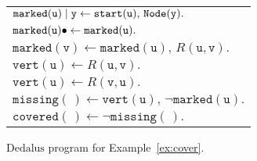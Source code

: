 \documentclass{tlp}
\newenvironment{cenchop}{\renewcommand{\arraystretch}{1.3}\begin{center}\begin{tabular}{l}}{\end{tabular}\end{center}\renewcommand{\arraystretch}{1}}
\newcommand{\qsp}{\\[1.2ex]}
\newcommand{\langname}[1]{\text{#1}}  \newcommand{\pred}[1]{\mathtt{#1}}  \newcommand{\fname}[1]{\mathit{#1}}  \newcommand{\sq}[1]{`{#1}'}
\newcommand{\dedalus}{\langname{Dedalus}}
\newcommand{\ntup}{(\,)}
\newcommand{\var}[1]{\mathtt{#1}}
\begin{document}
\begin{figure}
    \begin{framed}
    \begin{cenchop}
        $\pred{marked}(\var u)\sugas{\var y}\gets\pred{start}(\var u),\,\relnode(\var y).$\qsp
        
        $\pred{marked}(\var u)\sugind\gets\pred{\pred{marked}}(\var u).$\qsp

        $\pred{marked}(\var v)\gets\pred{marked}(\var u),\, R(\var u,\var v).$\\

        $\pred{vert}(\var u)\gets R(\var u,\var v).$\\

        $\pred{vert}(\var u)\gets R(\var v,\var u).$\\

        $\pred{missing}\ntup\gets\pred{vert}(\var u),\,\neg\pred{marked}(\var u).$\\

        $\pred{covered}\ntup\gets\neg\pred{missing}\ntup.$
    \end{cenchop}
    \end{framed}
    \caption{\label{fig:example-vertex-reach}$\dedalus$ program for Example~\ref{ex:cover}.}
\end{figure}
\end{document}
